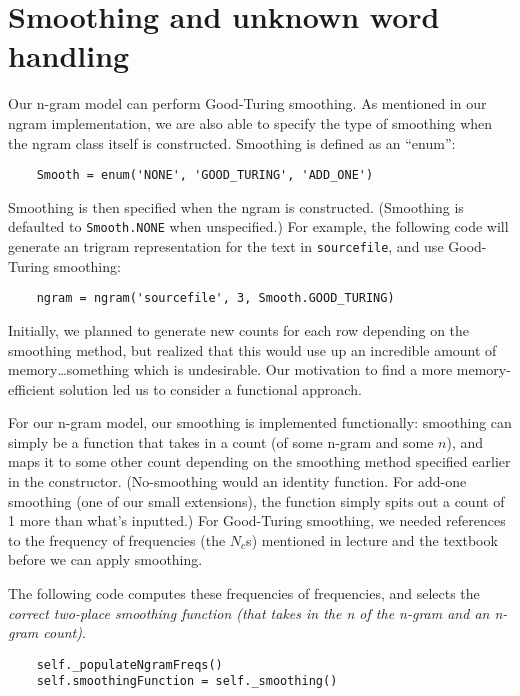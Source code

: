 \documentclass{article}
\begin{document}
\fi

\section{Smoothing and unknown word handling}

Our n-gram model can perform Good-Turing smoothing. As mentioned in our ngram implementation, we are also able to specify the type of smoothing when the ngram class itself is constructed. Smoothing is defined as an ``enum'':

{\small\begin{verbatim}
    Smooth = enum('NONE', 'GOOD_TURING', 'ADD_ONE')
\end{verbatim}}

Smoothing is then specified when the ngram is constructed. (Smoothing is defaulted to \texttt{Smooth.NONE} when unspecified.) For example, the following code will generate an trigram representation for the text in \texttt{sourcefile}, and use Good-Turing smoothing:
{\small\begin{verbatim}
    ngram = ngram('sourcefile', 3, Smooth.GOOD_TURING)
\end{verbatim}}

Initially, we planned to generate new counts for each row depending on the smoothing method, but realized that this would use up an incredible amount of memory\ldots something which is undesirable. Our motivation to find a more memory-efficient solution led us to consider a functional approach.\par
For our n-gram model, our smoothing is implemented functionally: smoothing can simply be a function that takes in a count (of some n-gram and some $n$), and maps it to some other count depending on the smoothing method specified earlier in the constructor. (No-smoothing would an identity function. For add-one smoothing (one of our small extensions), the function simply spits out a count of 1 more than what's inputted.) For Good-Turing smoothing, we needed references to the frequency of frequencies (the $N_c$s) mentioned in lecture and the textbook before we can apply smoothing.\par

The following code computes these frequencies of frequencies, and selects the \emph{correct two-place smoothing function (that takes in the \emph{n} of the n-gram and an n-gram count)}.

{\small\begin{verbatim}
    self._populateNgramFreqs()
    self.smoothingFunction = self._smoothing()
\end{verbatim}}
\end{document}
